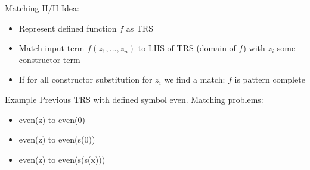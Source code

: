 \begin{frame}{Matching II/II}
Idea:
\begin{itemize}
    \item Represent defined function $f$ as TRS
    \item Match input term $f(z_1, ..., z_n)$ to LHS of TRS (domain of $f$) with $z_i$ some constructor term
    \item If for all constructor substitution for $z_i$ we find a match: $f$ is pattern complete
\end{itemize}

\begin{block}{Example}
Previous TRS with defined symbol even. Matching problems:
\begin{itemize}
    \item even(z) to even(0)
    \item even(z) to even(s(0))
    \item even(z) to even(s(s(x)))
\end{itemize}
\end{block}
\end{frame}




     
     

